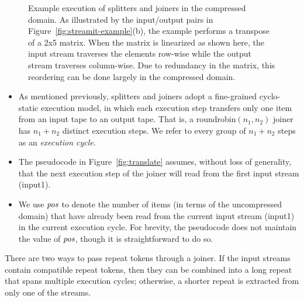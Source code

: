 \begin{figure*}[t]
\hspace{-0.045\textwidth}

\vspace{-10pt}
\caption{Example execution of splitters and joiners in the compressed
  domain.  As illustrated by the input/output pairs in
  Figure~\ref{fig:streamit-example}(b), the example performs a transpose
  of a 2x5 matrix.  When the matrix is linearized as shown here, the
  input stream traverses the elements row-wise while the output stream
  traverses column-wise.  Due to redundancy in the matrix, this
  reordering can be done largely in the compressed domain.
  \protect\label{fig:sj-example}}
\vspace{-3pt}
\end{figure*}

\begin{itemize}

\item \vspace{-2mm} As mentioned previously, splitters and joiners
  adopt a fine-grained cyclo-static execution model, in which each
  execution step transfers only one item from an input tape to an
  output tape.  That is, a roundrobin$(n_1, n_2)$ joiner has $n_1 +
  n_2$ distinct execution steps.  We refer to every group of $n_1 +
  n_2$ steps as an {\it execution cycle}.

\item \vspace{-2mm} The pseudocode in Figure~\ref{fig:translate}
  assumes, without loss of generality, that the next execution step of
  the joiner will read from the first input stream (input1).

\item \vspace{-2mm} We use $\mbox{\it pos}$ to denote the number of items (in
  terms of the uncompressed domain) that have already been read from
  the current input stream (input1) in the current execution cycle.
  For brevity, the pseudocode does not maintain the value of $\mbox{\it pos}$,
  though it is straightforward to do so.\vspace{-2mm}

\end{itemize}

There are two ways to pass repeat tokens through a joiner.  If the
input streams contain compatible repeat tokens, then they can be
combined into a long repeat that spans multiple execution cycles;
otherwise, a shorter repeat is extracted from only one of the streams.

